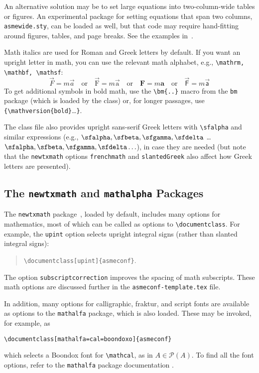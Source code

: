 \documentclass[balance,upint,subscriptcorrection,varvw,mathalfa=cal=boondoxo,spanish,french,vietnamese,russian,greek,pdf-a,colorlinks]{asmeconf}
\begin{document}
An alternative solution may be to set large equations into two-column-wide tables or figures. An experimental package for setting equations that span two columns, \texttt{asmewide.sty}, can be loaded as well, but that code may require hand-fitting around figures, tables, and page breaks. See the examples in~\cite{lienhard2022}.

Math italics are used for Roman and Greek letters by default.  If you want an upright letter in math, you can use the relevant math alphabet, e.g., \verb|\mathrm, \mathbf, \mathsf|:
\begin{equation}\label{eqn:dw}
\vec{F} = m \vec{a} \quad\textrm{or}\quad \vec{\mathrm{F}} = m \vec{\mathrm{a}} \quad\textrm{or}\quad \mathbf{F} = m \mathbf{a} \quad\textrm{or}\quad \vec{\mathsf{F}} = m \vec{\mathsf{a}}
\end{equation}
To get additional symbols in bold math, use the \verb|\bm{..}| macro from the \texttt{bm} package (which is loaded by the class) or, for longer passages, use \verb|{\mathversion{bold}|\ldots\texttt{\}}.

The class file also provides upright sans-serif Greek letters with \verb|\sfalpha| and similar expressions (e.g., $\sfalpha, \sfbeta, \sfgamma, \sfdelta$ \ldots $\bm{\sfalpha, \sfbeta, \sfgamma, \sfdelta \ldots}$), in case they are needed (but note that the \verb|newtxmath| options \verb|frenchmath| and \verb|slantedGreek| also affect how Greek letters are presented).

\subsection{The \texttt{newtxmath} and \texttt{mathalpha} Packages~\cite{sharpe1,sharpe2}} The \texttt{newtxmath} package~\cite{sharpe1}, loaded by default, includes many options for mathematics, most of which can be called as options to \verb|\documentclass|. For example, the \texttt{upint} option selects upright integral signs (rather than slanted integral signs):
\begin{quote}
\verb|\documentclass[upint]{asmeconf}|. 
\end{quote}  
The option \verb|subscriptcorrection| improves the spacing of math subscripts. These math options are discussed further in the \texttt{asmeconf-template.tex} file. 

In addition, many options for calligraphic, fraktur, and script fonts are available as options to the \texttt{mathalfa} package, which is also loaded. These may be invoked, for example, as 
\begin{center}
\verb|\documentclass[mathalfa=cal=boondoxo]{asmeconf}| 
\end{center}
which selects a Boondox font for \verb|\mathcal|, as in $A \in \mathcal{P}(A)$. To find all the font options, refer to the \texttt{mathalfa} package documentation \cite{sharpe2}.
\end{document}
